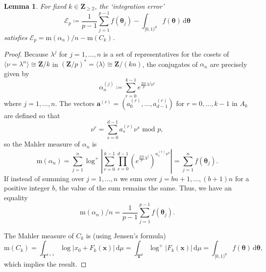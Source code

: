 \documentclass[12pt,reqno]{amsart}
\theoremstyle{definition}
\theoremstyle{plain}
\newtheorem{lemma}[theorem]{Lemma}
\theoremstyle{definition}
\newcommand{\Z}{\mathbf{Z}}
\newcommand{\T}{\mathbf{T}}
\newcommand\x{\mathbf{x}}
\newcommand\m{\mathrm{m}}
\newcommand\vtheta{\boldsymbol{\theta}}
\newcommand{\err}{\mathcal{E}}
\renewcommand{\geq}{\geqslant}
\renewcommand{\d}{\mathrm{d}}
\begin{document}
\begin{lemma}
For fixed $k \in \Z_{\geq 2}$, the `integration error'
\begin{equation*} 
\err_p \coloneqq \frac{1}{p-1} \sum_{j=1}^{p-1} f(\vtheta_j) - \int_{[0,1)^d} f(\vtheta) \, \d\vtheta
\end{equation*}
satisfies $\err_p = {\m(\alpha_n)}/{n} - \m(C_k)$.
\end{lemma}
\begin{proof}
Because $\lambda^j$ for $j=1,\dots,n$ is a set of representatives for the cosets of $\langle \nu=\lambda^n \rangle \cong \Z/k$ in $(\Z/p)^* = \langle \lambda \rangle \cong \Z/(kn)$, the conjugates of $\alpha_n$ are precisely given by   
$$\alpha_n^{(j)} \coloneqq  \sum_{r=0}^{k- 1}  e^{\frac{2 \pi i}{p} \lambda^j \nu^r}$$ where $j=1,\dots, n$. The vectors $\mathbf{a}^{(r)}=(a^{(r)}_0,\dots,a^{(r)}_{d-1})$ for $r=0,\dots,k-1$ in $A_k$ are defined so that 
$$ \nu^r = \sum_{s=0}^{d-1} a_s^{(r)} \nu^s \mbox{ mod } p, $$
so the Mahler measure of $\alpha_n$ is 
$$ \m(\alpha_n) =  \sum_{j=1}^{n} \log^+{\left| \sum_{r=0}^{k- 1}  \prod_{s=0}^{d-1} \left(e^{\frac{2 \pi i}{p} \lambda^j}\right)^{a^{(r)}_s \nu^s} \right|} = \sum_{j=1}^{n} f(\vtheta_j). $$
If instead of summing over $j=1,\dots,n$ we sum over $j=bn+1,\dots,(b+1)n$ for a positive integer $b$, the value of the sum remains the same. Thus, we have an equality $$\m(\alpha_n)/n = \frac{1}{p-1} \sum_{j=1}^{p-1} f(\vtheta_j).$$

The Mahler measure of $C_k$ is (using Jensen's formula) 
\begin{equation*} \m(C_k) = \int_{\T^{d+1}} \log |x_0+F_k(\mathbf{x})| \, \d\mu = \int_{\T^d} \log^+{|F_k(\x)|} \, \d\mu =  \int_{[0,1)^d} f(\vtheta) \, \d\vtheta, \end{equation*}
which implies the result. 
\end{proof}
\end{document}
